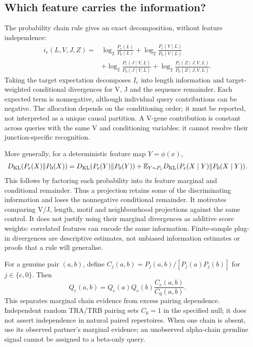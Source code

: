 \documentclass[10pt,a4paper]{article}
\theoremstyle{definition}
\begin{document}
\subsection{Which feature carries the information?}
The probability chain rule gives an exact decomposition, without feature independence:
\begin{align}
 i_e(L,V,J,Z)={}&\log_2\frac{P_e(L)}{P_0(L)}
 +\log_2\frac{P_e(V\mid L)}{P_0(V\mid L)}\nonumber\\
 &+\log_2\frac{P_e(J\mid V,L)}{P_0(J\mid V,L)}
 +\log_2\frac{P_e(Z\mid J,V,L)}{P_0(Z\mid J,V,L)}.
 \label{eq:selection-chain}
\end{align}
Taking the target expectation decomposes $I_e$ into length information and target-weighted conditional divergences for V, J and the sequence remainder.
Each expected term is nonnegative, although individual query contributions can be negative.
The allocation depends on the conditioning order; it must be reported, not interpreted as a unique causal partition.
A V-gene contribution is constant across queries with the same V and conditioning variables: it cannot resolve their junction-specific recognition.

More generally, for a deterministic feature map $Y=\phi(x)$,
\begin{equation}
 D_{\rm KL}(P_e(X)\Vert P_0(X))
 =D_{\rm KL}(P_e(Y)\Vert P_0(Y))
 +\mathbb E_{Y\sim P_e}D_{\rm KL}(P_e(X\mid Y)\Vert P_0(X\mid Y)).
 \label{eq:selection-projection}
\end{equation}
This follows by factoring each probability into its feature marginal and conditional remainder.
Thus a projection retains some of the discriminating information and loses the nonnegative conditional remainder.
It motivates comparing V/J, length, motif and neighbourhood projections against the same control.
It does not justify using their marginal divergences as additive score weights: correlated features can encode the same information.
Finite-sample plug-in divergences are descriptive estimates, not unbiased information estimates or proofs that a rule will generalise.

For a genuine pair $(a,b)$, define $C_j(a,b)=P_j(a,b)/[P_j(a)P_j(b)]$ for $j\in\{e,0\}$.
Then
\[
 Q_e(a,b)=Q_e(a)Q_e(b)\frac{C_e(a,b)}{C_0(a,b)}.
\]
This separates marginal chain evidence from excess pairing dependence.
Independent random TRA/TRB pairing sets $C_0=1$ in the specified null; it does not assert independence in natural paired repertoires.
When one chain is absent, use its observed partner's marginal evidence; an unobserved alpha-chain germline signal cannot be assigned to a beta-only query.
\end{document}

